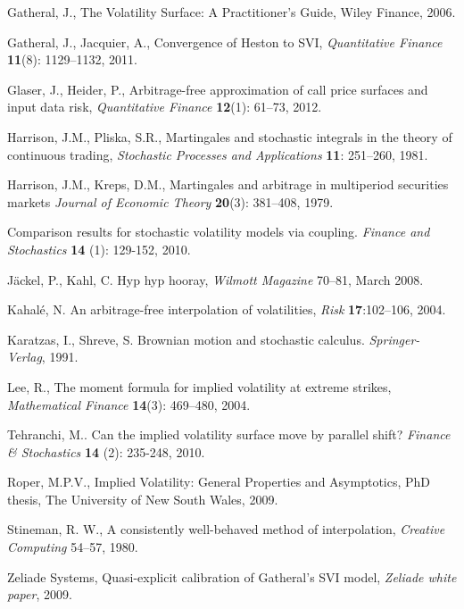\documentclass[12pt]{article}
\numberwithin{equation}{section}
\begin{document}
\begin{thebibliography}{}
 { Gatheral, J.},
{The Volatility Surface: A Practitioner's Guide},
{Wiley Finance}, 2006.

{ Gatheral, J.}, {Jacquier, A.},
{Convergence of Heston to SVI},
{\em Quantitative Finance} {\bf 11}(8): 1129--1132, 2011.

{ Glaser, J.}, {Heider, P.},
{Arbitrage-free approximation of call price surfaces and input data risk},
{\em Quantitative Finance} {\bf 12}(1): 61--73, 2012.

{Harrison, J.M.}, {Pliska, S.R.},
Martingales and stochastic integrals in the theory of continuous trading,
{\em Stochastic Processes and Applications} {\bf 11}: 251--260, 1981.

{Harrison, J.M.}, {Kreps, D.M.},
Martingales and arbitrage in multiperiod securities markets
{\em Journal of Economic Theory} {\bf 20}(3): 381--408, 1979.

Comparison results for stochastic volatility models via coupling. 
{\em Finance and Stochastics} {\bf 14} (1): 129-152, 2010.

{J\"ackel, P.}, {Kahl, C.}
{Hyp hyp hooray},
{\em Wilmott Magazine} 70--81, March 2008.

{Kahal\'e, N.}
{An arbitrage-free interpolation of volatilities},
{\em Risk} {\bf 17}:102--106, 2004.

{Karatzas, I.}, {Shreve, S.}
Brownian motion and stochastic calculus.
\textit{Springer-Verlag}, 1991.

{Lee, R.},
{The moment formula for implied volatility at extreme strikes},
{\em Mathematical Finance} {\bf 14}(3): 469--480, 2004.

 {Tehranchi, M.}.
Can the implied volatility surface move by parallel shift?
{\em Finance \& Stochastics} {\bf 14} (2): 235-248, 2010.

{Roper, M.P.V.}, 
Implied Volatility: General Properties and Asymptotics, 
PhD thesis, The University of New South Wales, 2009.

{Stineman, R. W.}, A consistently well-behaved method of interpolation, {\em Creative Computing} 54--57, 1980.

{Zeliade Systems}, Quasi-explicit calibration of Gatheral's SVI model, {\em Zeliade white paper}, 2009.

\end{thebibliography}
\end{document}
